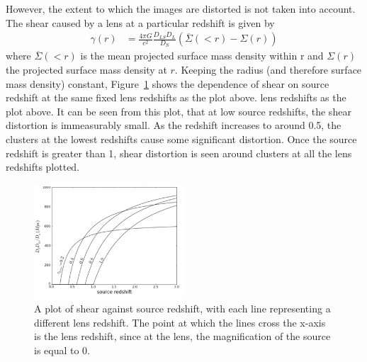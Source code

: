 		However, the extent to which the images are distorted is not taken into account. The shear caused by a lens at a particular redshift is given by
		\begin{align}
			\gamma(r) &= \frac{4\pi G}{c^2}\frac{D_{LS}D_L}{D_S}\left( \overline{\Sigma}(<r)-\Sigma(r) \right)
		\end{align}
		where $\overline{\Sigma}(<r)$ is the mean projected surface mass density within r and $\Sigma(r)$ the projected surface mass density at $r$. Keeping the radius (and therefore surface mass density) constant, Figure~\ref{fig:shear_as_a_function_of_source_redshift} shows the dependence of shear on source redshift at the same fixed lens redshifts as the plot above. lens redshifts as the plot above. It can be seen from this plot, that at low source redshifts, the shear distortion is immeasurably small. As the redshift increases to around 0.5, the clusters at the lowest redshifts cause some significant distortion. Once the source redshift is greater than 1, shear distortion is seen around clusters at all the lens redshifts plotted\cite{Constraining_source_redshift_distributions}.
		\begin{figure}[htbp]
			\centering
				\includegraphics[width=0.5\textwidth]{../Images/Shear_as_a_function_of_source_redshift.png}
			\caption[Shear as a function of source redshift]{\cite{Constraining_source_redshift_distributions}A plot of shear against source redshift, with each line representing a different lens redshift. The point at which the lines cross the x-axis is the lens redshift, since at the lens, the magnification of the source is equal to 0.\label{fig:shear_as_a_function_of_source_redshift}}
		\end{figure}


